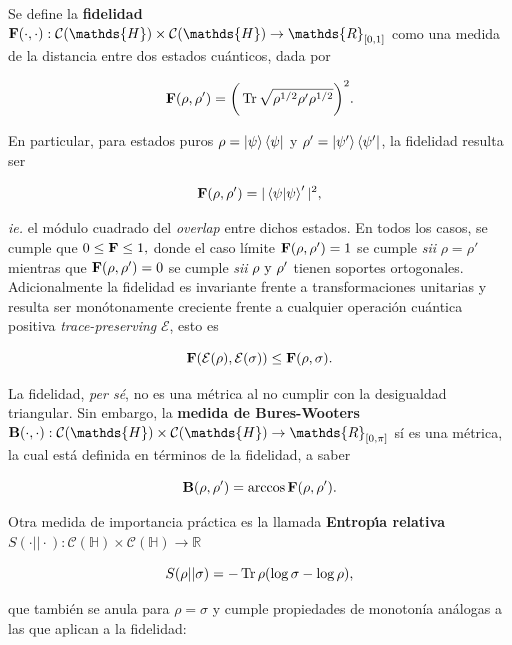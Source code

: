 \documentclass{report} %
\newcommand{\sii}{\textit{sii }}
\newcommand{\ie}{\textit{ie. }}
\numberwithin{equation}{section}
\begin{document}
Se define la \textbf{fidelidad} ${\bf F}(\cdot, \cdot): \mathcal{C}(\mathds{H}) \times \mathcal{C}(\mathds{H}) \rightarrow \mathds{R}_{[0,1]}$ \cite{Nielsen.00} como una medida de la distancia entre dos estados cuánticos, dada por

\begin{equation}
    {\bf F}(\rho,\rho') = \bigg( \Tr \sqrt{\rho^{1/2}\rho' \rho^{1/2}} \bigg)^2.
    \label{fidelity}
\end{equation}

En particular, para estados puros $\rho = \ket{\psi} \bra{\psi}$ y $\rho' = \ket{\psi'}\bra{\psi'}$, la fidelidad resulta ser 

$$
{\bf F}(\rho,\rho') = |\bra{\psi}\ket{\psi}'|^2,
$$

\noindent\ie el módulo cuadrado del \textit{overlap} entre dichos estados. En todos los casos, se cumple que $0 \leq {\bf F} \leq 1,$ donde el caso límite ${\bf F}(\rho,\rho') = 1$ se cumple \sii $\rho = \rho'$ mientras que ${\bf F}(\rho,\rho')=0$ se cumple \sii $\rho \textnormal{ y } \rho'$ tienen soportes ortogonales. Adicionalmente la fidelidad es invariante frente a transformaciones unitarias y resulta ser monótonamente creciente frente a cualquier operación cuántica positiva \textit{trace-preserving} $\mathcal{E}$, esto es 

$$
{\bf F} ({\mathcal E}(\rho), {\mathcal E}(\sigma))\leq {\bf F} (\rho, \sigma).
$$

La fidelidad, \textit{per sé}, no es una métrica al no cumplir con la desigualdad triangular. Sin embargo, la \textbf{medida de Bures-Wooters} ${\bf B}(\cdot, \cdot): \mathcal{C}(\mathds{H}) \times  \mathcal{C}(\mathds{H}) \rightarrow \mathds{R}_{[0, \pi]}$ \cite{Nielsen.00} sí es una métrica, la cual está definida en términos de la fidelidad, a saber

\begin{equation}
    {\bf B}(\rho,\rho') = \arccos {\bf F}(\rho,\rho').
    \label{Bures-Wooters}
\end{equation}

Otra medida de importancia práctica es la llamada \textbf{Entrop\'{\i}a relativa} $S(\cdot||\cdot): \mathcal{C}(\mathds{H}) \times \mathcal{C}(\mathds{H}) \rightarrow \mathds{R}$ \cite{reviewvedralqrs}

\begin{equation}
S(\rho||\sigma)=-\Tr \rho(\log \sigma-\log \rho),
    \label{relative entropy}
\end{equation}

\noindent que también se anula para $\rho=\sigma$ y cumple propiedades de monotonía análogas a las que aplican a la fidelidad:
\end{document}
